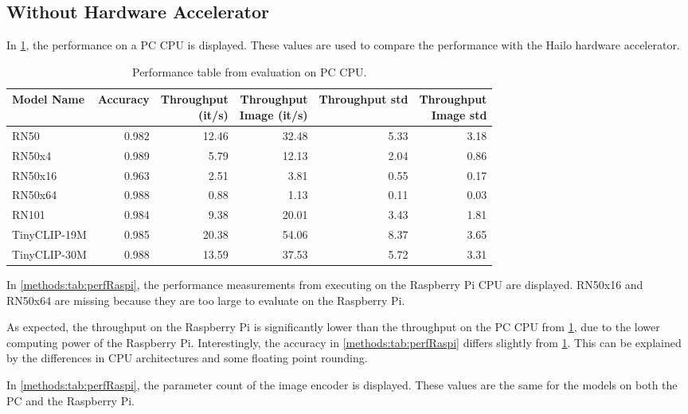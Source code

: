 \subsection{Without Hardware Accelerator}
In \cref{methods:tab:perfPC}, the performance on a PC CPU is displayed. These values are used to compare the performance with the Hailo hardware accelerator.

\begin{table}[tbp]
    \centering
    \begin{tabular}{l|rrrrr}
    \hline
        Model Name & Accuracy & \makecell{Throughput\\(it/s)} & \makecell{Throughput \\ Image (it/s)} & Throughput std & \makecell{Throughput\\Image std} \\ \hline
        RN50 & 0.982 & 12.46 & 32.48 & 5.33 & 3.18 \\ 
        RN50x4 & 0.989 & 5.79 & 12.13 & 2.04 & 0.86 \\ 
        RN50x16 & 0.963 & 2.51 & 3.81 & 0.55 & 0.17 \\ 
        RN50x64 & 0.988 & 0.88 & 1.13 & 0.11 & 0.03 \\
        RN101 & 0.984 & 9.38 & 20.01 & 3.43 & 1.81 \\  
        TinyCLIP-19M & 0.985 & 20.38 & 54.06 & 8.37 & 3.65 \\ 
        TinyCLIP-30M & 0.988 & 13.59 & 37.53 & 5.72 & 3.31 \\ 
    \end{tabular}
    \caption{Performance table from evaluation on PC CPU.}
    \label{methods:tab:perfPC}
\end{table}

In \cref{methods:tab:perfRaspi}, the performance measurements from executing on the Raspberry Pi CPU are displayed. RN50x16 and RN50x64 are missing because they are too large to evaluate on the Raspberry Pi.

As expected, the throughput on the Raspberry Pi is significantly lower than the throughput on the PC CPU from \cref{methods:tab:perfPC}, due to the lower computing power of the Raspberry Pi. Interestingly, the accuracy in \cref{methods:tab:perfRaspi} differs slightly from \cref{methods:tab:perfPC}. This can be explained by the differences in CPU architectures and some floating point rounding.

In \cref{methods:tab:perfRaspi}, the parameter count of the image encoder is displayed. These values are the same for the models on both the PC and the Raspberry Pi.



